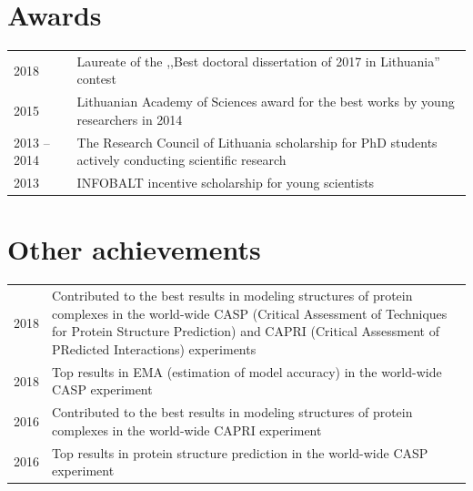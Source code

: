 \documentclass{article}
\begin{document}
\section*{Awards}
\begin{tabular}{p{}p{}}
2018 & Laureate of the ,,Best doctoral dissertation of 2017 in Lithuania'' contest \\
2015 & Lithuanian Academy of Sciences award for the best works by young researchers in 2014 \\
2013 -- 2014 & The Research Council of Lithuania scholarship for PhD students actively conducting scientific research \\
2013 & INFOBALT incentive scholarship for young scientists
\end{tabular}


\section*{Other achievements}
\begin{tabular}{p{}p{}}
2018 & Contributed to the best results in modeling structures of protein complexes
       in the world-wide CASP (Critical Assessment of Techniques for Protein Structure Prediction)
       and CAPRI (Critical Assessment of PRedicted Interactions) experiments \\
2018 & Top results in EMA (estimation of model accuracy)
       in the world-wide CASP experiment \\
2016 & Contributed to the best results in modeling structures of protein complexes
       in the world-wide CAPRI experiment \\
2016 & Top results in protein structure prediction
       in the world-wide CASP experiment
\end{tabular}
\end{document}
